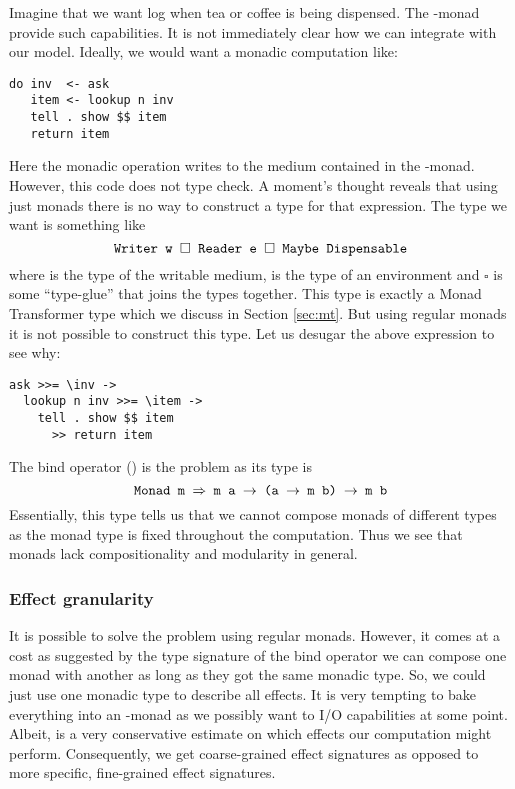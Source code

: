Imagine that we want log when tea or coffee is being dispensed. The -monad provide such capabilities. It is not immediately clear how we can integrate  with our model. Ideally, we would want  a monadic computation like:
\begin{lstlisting}[style={haskell}]
do inv  <- ask
   item <- lookup n inv
   tell . show $$ item
   return item
\end{lstlisting}
Here the monadic operation  writes to the medium contained in the -monad.
However, this code does not type check. A moment's thought reveals that using just monads there is no way to construct a type for that expression. The type we want is something like
\[ \texttt{Writer w $\square$ Reader e $\square$ Maybe Dispensable} \]
where  is the type of the writable medium,  is the type of an environment and $\square$ is some ``type-glue'' that joins the types together. This type is exactly a Monad Transformer type which we discuss in Section \ref{sec:mt}. But using regular monads it is not possible to construct this type. Let us desugar the above expression to see why:
\begin{lstlisting}[style={haskell}]
ask >>= \inv -> 
  lookup n inv >>= \item -> 
    tell . show $$ item 
      >> return item
\end{lstlisting}
The bind operator (\code{>>=}) is the problem as its type is
\[ \texttt{Monad m $\Rightarrow$ m a $\to$ (a $\to$ m b) $\to$ m b} \]
Essentially, this type tells us that we cannot compose monads of different types as the monad type  is fixed throughout the computation. Thus we see that monads lack compositionality and modularity in general.

\subsubsection{Effect granularity}%
It is possible to solve the problem using regular monads. However, it comes at a cost as suggested by the type signature of the bind operator we can compose one monad with another as long as they got the same monadic type. So, we could just use one monadic type to describe all effects. It is very tempting to bake everything into an -monad as we possibly want to I/O capabilities at some point. Albeit,  is a very conservative estimate on which effects our computation might perform. Consequently, we get coarse-grained effect signatures as opposed to more specific, fine-grained effect signatures.

